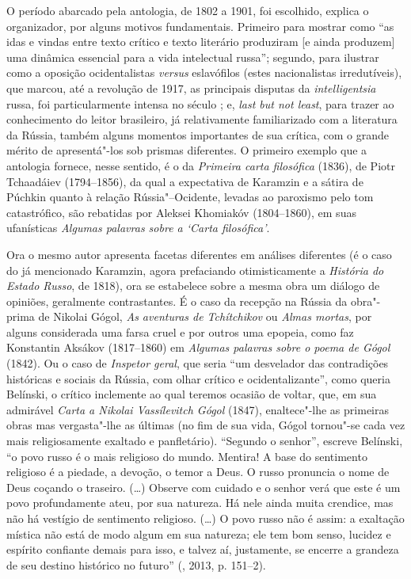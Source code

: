 {O período abarcado pela antologia, de 1802 a 1901, foi escolhido, explica o
organizador, por alguns motivos fundamentais. Primeiro para mostrar como
``as idas e vindas entre texto crítico e texto literário produziram [e ainda produzem] uma dinâmica essencial para a vida intelectual
russa''; segundo, para ilustrar como a oposição ocidentalistas \emph{versus}
eslavófilos (estes nacionalistas irredutíveis), que marcou, até a revolução
de 1917, as principais disputas da \emph{intelligentsia} russa, foi
particularmente intensa no século ; e, \emph{last but not least}, para
trazer ao conhecimento do leitor brasileiro, já relativamente
familiarizado com a literatura da Rússia, também alguns momentos
importantes de sua crítica, com o grande mérito de apresentá"-los sob
prismas diferentes. O primeiro exemplo que a antologia fornece, nesse sentido, é o da \emph{Primeira carta filosófica} (1836),
 de Piotr Tchaadáiev (1794--1856), da qual a
expectativa de Karamzin e a sátira de Púchkin quanto à relação
Rússia"--Ocidente, levadas ao paroxismo pelo tom catastrófico, são
rebatidas por Aleksei Khomiakóv (1804--1860), em suas ufanísticas \emph{Algumas
palavras sobre a `Carta filosófica'}.

Ora o mesmo autor apresenta facetas diferentes em análises diferentes (é o caso do já mencionado Karamzin, agora prefaciando otimisticamente a
\emph{História do Estado Russo}, de 1818), ora se estabelece sobre a
mesma obra um diálogo de opiniões, geralmente contrastantes. É o caso da
recepção na Rússia da obra"-prima de Nikolai Gógol, \emph{As aventuras de Tchítchikov} ou \emph{Almas mortas}, por alguns considerada uma
farsa cruel e por outros uma epopeia, como faz Konstantin Aksákov (1817--1860) em
\emph{Algumas palavras sobre o poema de Gógol} (1842). Ou o caso de \emph{Inspetor geral}, que seria ``um desvelador das contradições históricas e
sociais da Rússia, com olhar crítico e ocidentalizante'', como queria
Belínski, o crítico inclemente ao qual teremos ocasião de
voltar, que, em sua admirável \emph{Carta a Nikolai Vassílevitch Gógol} (1847), enaltece"-lhe as primeiras obras mas vergasta"-lhe as últimas (no
fim de sua vida, Gógol tornou"-se cada vez mais religiosamente exaltado
e panfletário). ``Segundo o senhor'', escreve Belínski, ``o povo russo
é o mais religioso do mundo. Mentira! A base do sentimento religioso é a
piedade, a devoção, o temor a Deus. O russo pronuncia o nome de Deus
coçando o traseiro. (\ldots{}) Observe com cuidado e o senhor verá que este é
um povo profundamente ateu, por sua natureza. Há nele ainda muita
crendice, mas não há vestígio de sentimento religioso. (\ldots{}) O povo
russo não é assim: a exaltação mística não está de modo algum em sua
natureza; ele tem bom senso, lucidez e espírito confiante demais para
isso, e talvez aí, justamente, se encerre a grandeza de seu destino
histórico no futuro'' (, 2013, p. 151--2).

}
